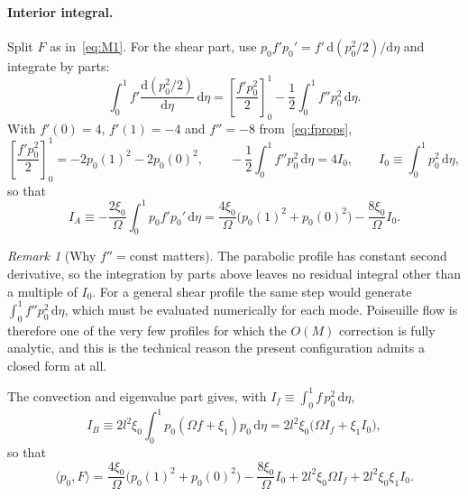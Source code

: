 \documentclass[11pt,a4paper]{article}
\newcommand{\Om}{\Omega}
\newcommand{\dd}{\mathrm{d}}
\theoremstyle{plain}
\theoremstyle{remark}
\newtheorem{remark}[theorem]{Remark}
\begin{document}
\paragraph{Interior integral.} Split $F$ as in~\eqref{eq:M1}. For the shear part, use
$p_0f'p_0'=f'\,\dd(p_0^2/2)/\dd\eta$ and integrate by parts:
\begin{equation}
\int_0^1f'\frac{\dd(p_0^2/2)}{\dd\eta}\,\dd\eta
=\left[\frac{f'p_0^2}{2}\right]_0^1-\frac12\int_0^1f''p_0^2\,\dd\eta .
\end{equation}
With $f'(0)=4$, $f'(1)=-4$ and $f''=-8$ from~\eqref{eq:fprops},
\begin{equation}
\left[\frac{f'p_0^2}{2}\right]_0^1=-2p_0(1)^2-2p_0(0)^2,
\qquad
-\frac12\int_0^1f''p_0^2\,\dd\eta=4I_0,
\qquad I_0\equiv\int_0^1p_0^2\,\dd\eta,
\end{equation}
so that
\begin{equation}
I_A\equiv-\frac{2\xi_0}{\Om}\int_0^1p_0f'p_0'\,\dd\eta
=\frac{4\xi_0}{\Om}\bigl(p_0(1)^2+p_0(0)^2\bigr)-\frac{8\xi_0}{\Om}I_0 .
\label{eq:IA}
\end{equation}

\begin{remark}[Why $f''=\mathrm{const}$ matters]\label{rem:fpp}
The parabolic profile has constant second derivative, so the integration by parts above leaves no
residual integral other than a multiple of $I_0$. For a general shear profile the same step would
generate $\int_0^1f''p_0^2\,\dd\eta$, which must be evaluated numerically for each mode. Poiseuille
flow is therefore one of the very few profiles for which the $O(M)$ correction is fully analytic, and
this is the technical reason the present configuration admits a closed form at all.
\end{remark}

The convection and eigenvalue part gives, with $I_f\equiv\int_0^1f\,p_0^2\,\dd\eta$,
\begin{equation}
I_B\equiv2l^2\xi_0\int_0^1p_0(\Om f+\xi_1)p_0\,\dd\eta
=2l^2\xi_0\bigl(\Om I_f+\xi_1I_0\bigr),
\label{eq:IB}
\end{equation}
so that
\begin{equation}
\langle p_0,F\rangle=\frac{4\xi_0}{\Om}\bigl(p_0(1)^2+p_0(0)^2\bigr)-\frac{8\xi_0}{\Om}I_0
+2l^2\xi_0\Om I_f+2l^2\xi_0\xi_1I_0 .
\label{eq:rhs}
\end{equation}
\end{document}
